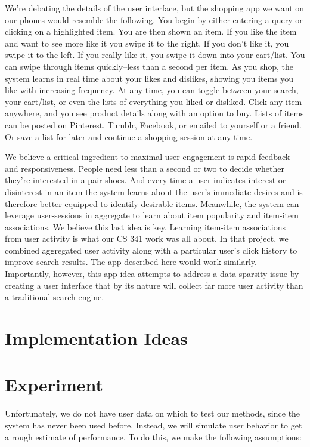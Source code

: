 \documentclass[10pt]{article}
\begin{document}
We're debating the details of the user interface, but the shopping app we want
on our phones would resemble the following. You begin by either entering a
query or clicking on a highlighted item. You are then shown an item. If you
like the item and want to see more like it you swipe it to the right. If you
don't like it, you swipe it to the left. If you really like it, you swipe it
down into your cart/list. You can swipe through items quickly--less than a
second per item. As you shop, the system learns in real time about your likes
and dislikes, showing you items you like with increasing frequency. At any
time, you can toggle between your search, your cart/list, or even the lists of
everything you liked or disliked. Click any item anywhere, and you see product
details along with an option to buy. Lists of items can be posted on Pinterest,
Tumblr, Facebook, or emailed to yourself or a friend. Or save a list for later
and continue a shopping session at any time.

We believe a critical ingredient to maximal user-engagement is rapid feedback
and responsiveness. People need less than a second or two to decide whether
they're interested in a pair shoes. And every time a user indicates interest or
disinterest in an item the system learns about the user's immediate desires and
is therefore better equipped to identify desirable items. Meanwhile, the system
can leverage user-sessions in aggregate to learn about item popularity and
item-item associations.  We believe this last idea is key. Learning item-item
associations from user activity is what our CS 341 work was all about. In that
project, we combined aggregated user activity along with a particular user's
click history to improve search results. The app described here would work
similarly. Importantly, however, this app idea attempts to address a data
sparsity issue by creating a user interface that by its nature will collect far
more user activity than a traditional search engine.

\section*{Implementation Ideas}

\section*{Experiment}
Unfortunately, we do not have user data on which to test our methods, since the system
has never been used before. Instead, we will simulate user behavior to get a rough
estimate of performance. To do this, we make the following assumptions:
\end{document}
